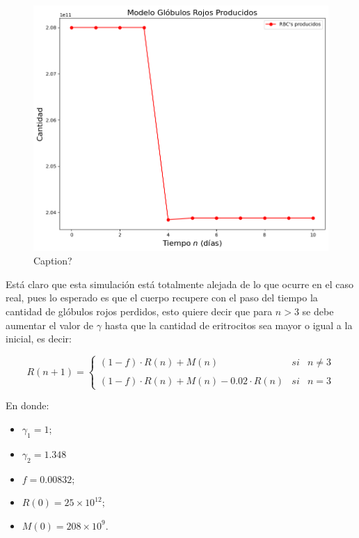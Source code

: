 \begin{figure}[H]
    \centering
    \includegraphics[scale=0.57]{figures/HemoLeveG1SC.png}
    \caption{Caption?}
    \label{sec:variaciones:fig:HemoLeveG1SC}
\end{figure}

Está claro que esta simulación está totalmente alejada de lo que ocurre en el caso real, pues lo esperado es que el cuerpo recupere con el paso del tiempo la cantidad de glóbulos rojos perdidos, esto quiere decir que para $n>3$ se debe aumentar el valor de $\gamma$ hasta que la cantidad de eritrocitos sea mayor o igual a la inicial, es decir:

$$R(n+1)= \left\{ \begin{array}{lcc} (1-f)\cdot R(n)+M(n) & si & n \neq 3 \\ \\ (1-f)\cdot R(n)+M(n)-0.02\cdot R(n) & si & n = 3\end{array} \right.$$

En donde:
\begin{itemize}
    \item $\gamma_1=1$;
    \item $\gamma_2=1.348$
    \item $f=0.00832$;
    \item $R(0) = 25\times 10^{12};$
    \item $M(0) = 208 \times 10^{9}.$
\end{itemize}

